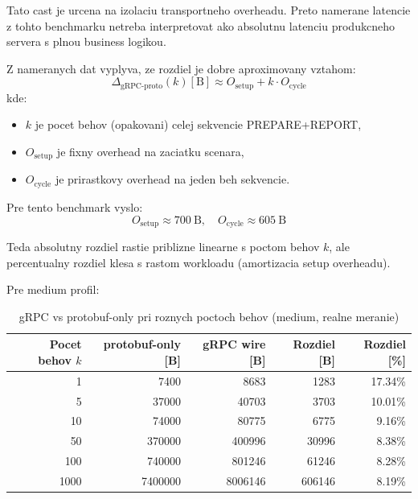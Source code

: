\documentclass[12pt,a4paper]{report}
\begin{document}
Tato cast je urcena na izolaciu transportneho overheadu.
Preto namerane latencie z tohto benchmarku netreba interpretovat
ako absolutnu latenciu produkcneho servera s plnou business logikou.

Z nameranych dat vyplyva, ze rozdiel je dobre aproximovany vztahom:
\begin{equation}
\Delta_{\text{gRPC-proto}}(k) [\text{B}] \approx O_{\text{setup}} + k \cdot O_{\text{cycle}}
\end{equation}
kde:
\begin{itemize}
  \item $k$ je pocet behov (opakovani) celej sekvencie PREPARE+REPORT,
  \item $O_{\text{setup}}$ je fixny overhead na zaciatku scenara,
  \item $O_{\text{cycle}}$ je prirastkovy overhead na jeden beh sekvencie.
\end{itemize}

Pre tento benchmark vyslo:
\begin{equation}
O_{\text{setup}} \approx 700~\text{B}, \quad O_{\text{cycle}} \approx 605~\text{B}
\end{equation}

Teda absolutny rozdiel rastie priblizne linearne s poctom behov $k$, ale
percentualny rozdiel klesa s rastom workloadu (amortizacia setup overheadu).

Pre medium profil:
\begin{table}[htbp]
\centering
\caption{gRPC vs protobuf-only pri roznych poctoch behov (medium, realne meranie)}
\label{tab:grpc-proto-runs-medium}
\begin{tabular}{|r|r|r|r|r|}
\hline
Pocet behov $k$ & protobuf-only [B] & gRPC wire [B] & Rozdiel [B] & Rozdiel [\%] \\
\hline
1    & 7400    & 8683    & 1283    & 17.34\% \\
5    & 37000   & 40703   & 3703    & 10.01\% \\
10   & 74000   & 80775   & 6775    & 9.16\% \\
50   & 370000  & 400996  & 30996   & 8.38\% \\
100  & 740000  & 801246  & 61246   & 8.28\% \\
1000 & 7400000 & 8006146 & 606146  & 8.19\% \\
\hline
\end{tabular}
\end{table}
\end{document}
